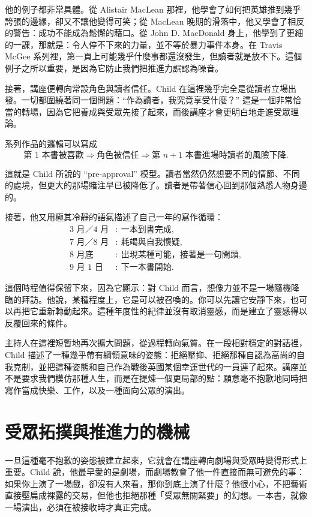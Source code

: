 他的例子都非常具體。從 Alistair MacLean 那裡，他學會了如何把英雄推到幾乎誇張的邊緣，卻又不讓他變得可笑；從 MacLean 晚期的滑落中，他又學會了相反的警告：成功不能成為鬆懈的藉口。從 John D. MacDonald 身上，他學到了更細的一課，那就是：令人停不下來的力量，並不等於暴力事件本身。在 Travis McGee 系列裡，第一頁上可能幾乎什麼事都還沒發生，但讀者就是放不下。這個例子之所以重要，是因為它防止我們把推進力誤認為噪音。

接著，講座便轉向常設角色與讀者信任。Child 在這裡幾乎完全是從讀者立場出發。一切都圍繞著同一個問題：``作為讀者，我究竟享受什麼？'' 這是一個非常恰當的轉場，因為它把養成與受眾先接了起來，而後講座才會更明白地走進受眾理論。

系列作品的邏輯可以寫成
\begin{equation}
\text{第 1 本書被喜歡} \Longrightarrow \text{角色被信任} \Longrightarrow \text{第 } n+1 \text{ 本書進場時讀者的風險下降}.
\end{equation}

這就是 Child 所說的 ``pre-approval'' 模型。讀者當然仍然想要不同的情節、不同的處境，但更大的那場賭注早已被降低了。讀者是帶著信心回到那個熟悉人物身邊的。

接著，他又用極其冷靜的語氣描述了自己一年的寫作循環：
\begin{align}
\text{3 月／4 月} &:\ \text{一本到書完成},\\
\text{7 月／8 月} &:\ \text{耗竭與自我懷疑},\\
\text{8 月底} &:\ \text{出現某種可能，接著是一句開頭},\\
\text{9 月 1 日} &:\ \text{下一本書開始}.
\end{align}

這個時程值得保留下來，因為它顯示：對 Child 而言，想像力並不是一場隨機降臨的拜訪。他說，某種程度上，它是可以被召喚的。你可以先讓它安靜下來，也可以再把它重新轉動起來。這種年度性的紀律並沒有取消靈感，而是建立了靈感得以反覆回來的條件。

主持人在這裡短暫地再次擴大問題，從過程轉向氣質。在一段相對穩定的對話裡，Child 描述了一種幾乎帶有綱領意味的姿態：拒絕壓抑、拒絕那種自認為高尚的自我克制，並把這種姿態和自己作為戰後英國某個幸運世代的一員連了起來。講座並不是要求我們模仿那種人生，而是在提煉一個更局部的點：願意毫不抱歉地同時把寫作當成快樂、工作，以及一種面向公眾的演出。

\section{受眾拓撲與推進力的機械}

一旦這種毫不抱歉的姿態被建立起來，它就會在講座轉向劇場與受眾時變得形式上重要。Child 說，他最早愛的是劇場，而劇場教會了他一件直接而無可避免的事：如果你上演了一場戲，卻沒有人來看，那你到底上演了什麼？他很小心，不把藝術直接壓扁成裸露的交易，但他也拒絕那種「受眾無關緊要」的幻想。一本書，就像一場演出，必須在被接收時才真正完成。

